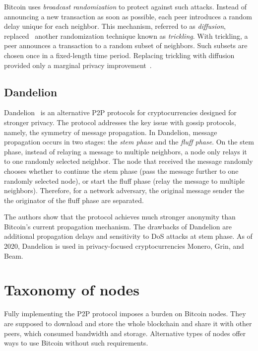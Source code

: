 Bitcoin uses \textit{broadcast randomization} to protect against such attacks.
Instead of announcing a new transaction as soon as possible, each peer introduces a random delay unique for each neighbor.
This mechanism, referred to as \textit{diffusion}, replaced~\cite{Wuille} another randomization technique known as \textit{trickling}.
With trickling, a peer announces a transaction to a random subset of neighbors.
Such subsets are chosen once in a fixed-length time period.
Replacing trickling with diffusion provided only a marginal privacy improvement~\cite{Fanti2017}.


\subsection{Dandelion}
\label{sec:Dandelion}

Dandelion~\cite{Venkatakrishnan2017, Fanti2018} is an alternative P2P protocols for cryptocurrencies designed for stronger privacy.
The protocol addresses the key issue with gossip protocols, namely, the symmetry of message propagation.
In Dandelion, message propagation occurs in two stages: the \textit{stem phase} and the \textit{fluff phase}.
On the stem phase, instead of relaying a message to multiple neighbors, a node only relays it to one randomly selected neighbor.
The node that received the message randomly chooses whether to continue the stem phase (pass the message further to one randomly selected node), or start the fluff phase (relay the message to multiple neighbors).
Therefore, for a network adversary, the original message sender the the originator of the fluff phase are separated.

The authors show that the protocol achieves much stronger anonymity than Bitcoin's current propagation mechanism.
The drawbacks of Dandelion are additional propagation delays and sensitivity to DoS attacks at stem phase.
As of 2020, Dandelion is used in privacy-focused cryptocurrencies Monero, Grin, and Beam.


\section{Taxonomy of nodes}

Fully implementing the P2P protocol imposes a burden on Bitcoin nodes.
They are supposed to download and store the whole blockchain and share it with other peers, which consumed bandwidth and storage.
Alternative types of nodes offer ways to use Bitcoin without such requirements.

